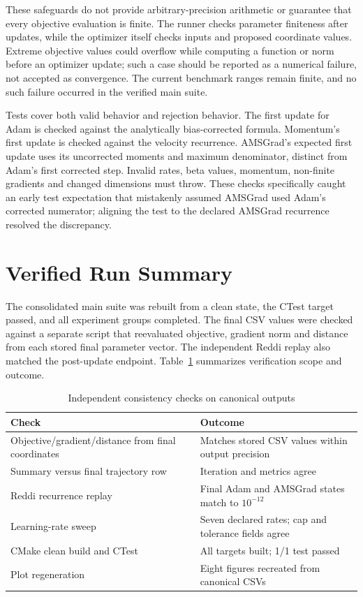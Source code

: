 \documentclass[conference]{IEEEtran}
\begin{document}
These safeguards do not provide arbitrary-precision arithmetic or guarantee that every objective evaluation is finite. The runner checks parameter finiteness after updates, while the optimizer itself checks inputs and proposed coordinate values. Extreme objective values could overflow while computing a function or norm before an optimizer update; such a case should be reported as a numerical failure, not accepted as convergence. The current benchmark ranges remain finite, and no such failure occurred in the verified main suite.

Tests cover both valid behavior and rejection behavior. The first update for Adam is checked against the analytically bias-corrected formula. Momentum's first update is checked against the velocity recurrence. AMSGrad's expected first update uses its uncorrected moments and maximum denominator, distinct from Adam's first corrected step. Invalid rates, beta values, momentum, non-finite gradients and changed dimensions must throw. These checks specifically caught an early test expectation that mistakenly assumed AMSGrad used Adam's corrected numerator; aligning the test to the declared AMSGrad recurrence resolved the discrepancy.
\section{Verified Run Summary}
The consolidated main suite was rebuilt from a clean state, the CTest target passed, and all experiment groups completed. The final CSV values were checked against a separate script that reevaluated objective, gradient norm and distance from each stored final parameter vector. The independent Reddi replay also matched the post-update endpoint. Table~\ref{tab:verification} summarizes verification scope and outcome.
\begin{table}[t]
\caption{Independent consistency checks on canonical outputs}
\label{tab:verification}
\centering
\small
\begin{tabular}{p{}p{}}
\toprule
Check & Outcome\\
\midrule
Objective/gradient/distance from final coordinates & Matches stored CSV values within output precision\\
Summary versus final trajectory row & Iteration and metrics agree\\
Reddi recurrence replay & Final Adam and AMSGrad states match to $10^{-12}$\\
Learning-rate sweep & Seven declared rates; cap and tolerance fields agree\\
CMake clean build and CTest & All targets built; 1/1 test passed\\
Plot regeneration & Eight figures recreated from canonical CSVs\\
\bottomrule
\end{tabular}
\end{table}
\end{document}
